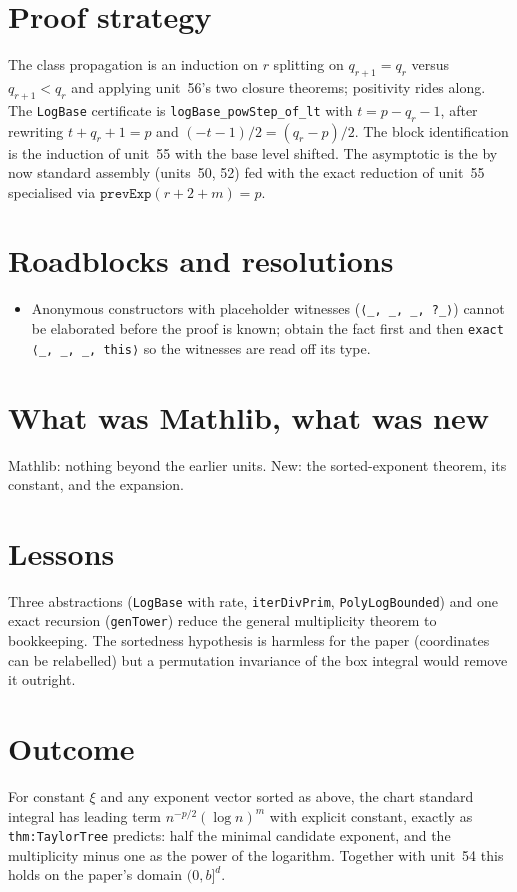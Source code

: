 \documentclass[11pt]{article}
\begin{document}
\section{Proof strategy}
The class propagation is an induction on $r$ splitting on $q_{r+1}=q_r$ versus $q_{r+1}<q_r$ and
applying unit~56's two closure theorems; positivity rides along. The \texttt{LogBase} certificate is
\texttt{logBase\_powStep\_of\_lt} with $t=p-q_r-1$, after rewriting $t+q_r+1=p$ and
$(-t-1)/2=(q_r-p)/2$. The block identification is the induction of unit~55 with the base level
shifted. The asymptotic is the by now standard assembly (units~50, 52) fed with the exact reduction of
unit~55 specialised via $\texttt{prevExp}(r+2+m)=p$.

\section{Roadblocks and resolutions}
\begin{itemize}
\item Anonymous constructors with placeholder witnesses (\texttt{⟨\_, \_, \_, ?\_⟩}) cannot be
elaborated before the proof is known; obtain the fact first and then \texttt{exact ⟨\_, \_, \_, this⟩}
so the witnesses are read off its type.
\end{itemize}

\section{What was Mathlib, what was new}
Mathlib: nothing beyond the earlier units. New: the sorted-exponent theorem, its constant, and the
expansion.

\section{Lessons}
Three abstractions (\texttt{LogBase} with rate, \texttt{iterDivPrim}, \texttt{PolyLogBounded}) and
one exact recursion (\texttt{genTower}) reduce the general multiplicity theorem to bookkeeping. The
sortedness hypothesis is harmless for the paper (coordinates can be relabelled) but a permutation
invariance of the box integral would remove it outright.

\section{Outcome}
For constant $\xi$ and any exponent vector sorted as above, the chart standard integral has leading
term $n^{-p/2}(\log n)^m$ with explicit constant, exactly as \texttt{thm:TaylorTree} predicts: half
the minimal candidate exponent, and the multiplicity minus one as the power of the logarithm. Together
with unit~54 this holds on the paper's domain $(0,b]^d$.
\end{document}
